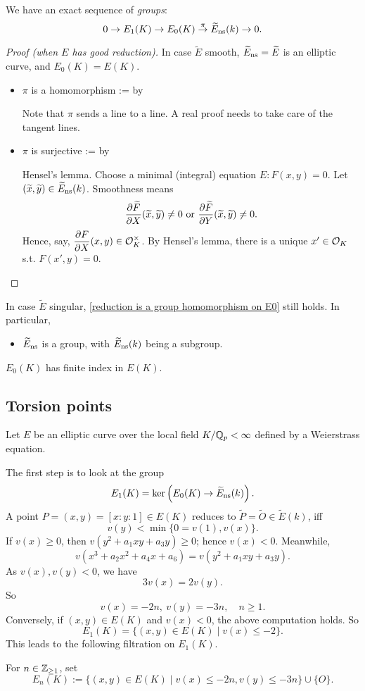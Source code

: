 \begin{proposition}\label{reduction is a group homomorphism on E0}
    We have an exact sequence of \textit{groups}:
    \[0\to E_1(K)\to E_0(K)\stackrel{\pi}{\to} \widetilde{E}_{\mathrm{ns}}(k)\to 0.\]
\end{proposition}
\begin{proof}[Proof (when $E$ has good reduction)]
    In case $\tilde{E}$ smooth, $\widetilde{E}_{\mathrm{ns}} = \widetilde{E}$ is an elliptic curve, and $E_0(K) = E(K)$.
    \begin{itemize}
\item $\pi$ is a homomorphism := by \par
Note that $\pi$ sends a line to a line. A real proof needs to take care of the tangent lines.
\item $\pi$ is surjective := by \par
Hensel's lemma. Choose a minimal (integral) equation $E : F(x, y) = 0$.
Let $(\widetilde{x}, \widetilde{y})\in \widetilde{E}_{\mathrm{ns}}(k)$.
Smoothness means
\[\dfrac{\partial \widetilde{F}}{\partial X}(\widetilde{x}, \widetilde{y})\ne 0\text{
or }\dfrac{\partial \widetilde{F}}{\partial Y}(\widetilde{x}, \widetilde{y})\ne 0.\]
Hence, say, $\dfrac{\partial F}{\partial X}(x, y) \in \mathcal{O}_K^\times$.
By Hensel's lemma, there is a unique $x'\in\mathcal{O}_K$ s.t. $F(x', y) = 0$.\qedhere
    \end{itemize}
\end{proof}
\begin{remark}
    In case $\tilde{E}$ singular, \cref{reduction is a group homomorphism on E0} still holds. In particular,
    \begin{itemize}
\item $\widetilde{E}_{\mathrm{ns}}$ is a group, with $\widetilde{E}_{\mathrm{ns}}(k)$ being a subgroup.
    \end{itemize}
\end{remark}

\begin{proposition}
    $E_0(K)$ has finite index in $E(K)$.
\end{proposition}


\subsection{Torsion points}
Let $E$ be an elliptic curve over the local field $K/\mathbb{Q}_p < \infty$ defined by a Weierstrass equation.

The first step is to look at the group \[E_1(K) = \ker \left( E_0(K)\to\widetilde{E}_{\mathrm{ns}}(k) \right).\]
A point $P = (x, y) = [x : y : 1]\in E(K)$ reduces to $\tilde{P} = \tilde{O}\in \tilde{E}(k)$,
iff \[v(y) < \min\{0 = v(1), v(x)\}.\]
If $v(x)\ge 0$, then $v(y^2 + a_1xy + a_3y)\ge 0 $;
hence $v(x) < 0$.
Meanwhile,\[v(x^3 + a_2x^2 + a_4x + a_6) =v(y^2 + a_1xy + a_3y).\]
As $v(x), v(y) < 0$, we have
\[3v(x) = 2v(y).\]
So \[v(x) = -2n,\ v(y) = -3n,\quad n\ge 1.\]
Conversely, if $(x, y)\in E(K)$ and $v(x) < 0$,
the above computation holds.
So \[E_1(K) = \{(x, y)\in E(K)\mid v(x)\le -2\}.\]
This leads to the following filtration on $E_1(K)$.
\begin{definition}
    For $n\in\mathbb{Z}_{\ge 1}$,
    set \[E_n(K) := \{(x, y)\in E(K)\mid v(x)\le -2n, v(y)\le -3n\}\cup\{O\}.\]
\end{definition}

